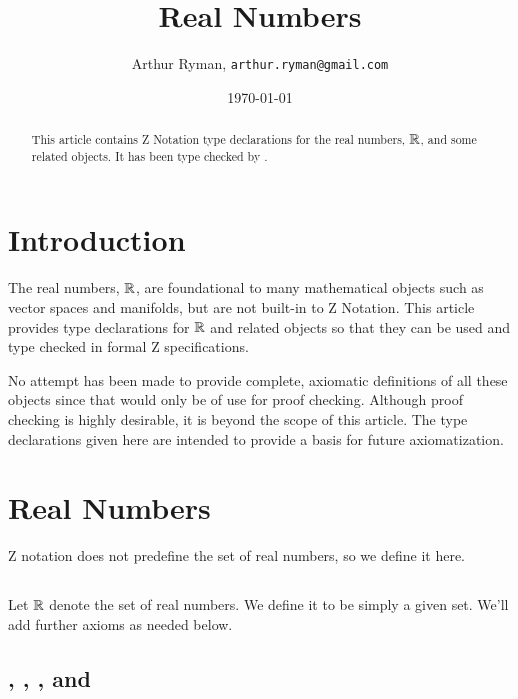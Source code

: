 \documentclass[11pt, oneside]{article}
\title{Real Numbers}
\author{Arthur Ryman, {\tt arthur.ryman@gmail.com}}
\date{\today}
\begin{document}
\maketitle

\begin{abstract}
This article contains Z Notation type declarations for the real numbers, $\mathbb{R}$, and some related objects.
It has been type checked by \fuzz.
\end{abstract}

\tableofcontents

\section{Introduction}

The real numbers, $\mathbb{R}$, are foundational to many mathematical objects such as vector spaces and manifolds,
but are not built-in to Z Notation.
This article provides type declarations for $\mathbb{R}$ and related objects so that they can be used and type checked in formal Z specifications.

No attempt has been made to provide complete, axiomatic definitions of all these objects since that would only be of use for proof checking.
Although proof checking is highly desirable, it is beyond the scope of this article.
The type declarations given here are intended to provide a basis for future axiomatization.

\section{Real Numbers}

Z notation does not predefine the set of real numbers, so we define it here.

\subsection{}

Let $\mathbb{R}$ denote the set of real numbers.
We define it to be simply a given set.
We'll add further axioms as needed below.

\begin{zed}
[\R]
\end{zed}

\subsection{, , , and }
\end{document}
